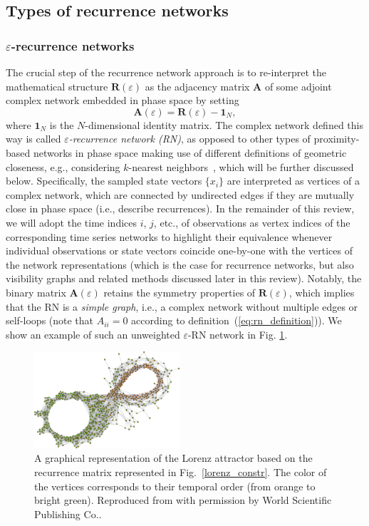 	\subsection{Types of recurrence networks}
		\subsubsection{$\varepsilon$-recurrence networks}
		The crucial step of the recurrence network approach is to re-interpret the mathematical structure $\textbf{R}(\varepsilon)$ as the adjacency matrix $\mathbf{A}$ of some adjoint complex network embedded in phase space by setting
\begin{equation}
\mathbf{A}(\varepsilon)=\mathbf{R}(\varepsilon)-\mathbf{1}_N,
\label{eq:rn_definition}
\end{equation}
\noindent
where $\mathbf{1}_N$ is the $N$-dimensional identity matrix. The complex network defined this way is called \emph{$\varepsilon$-recurrence network (RN)}, as opposed to other types of proximity-based networks in phase space making use of different definitions of geometric closeness, e.g., considering $k$-nearest neighbors~\cite{Donner2011}, which will be further discussed below. Specifically, the sampled state vectors $\{x_i\}$ are interpreted as vertices of a complex network, which are connected by undirected edges if they are mutually close in phase space (i.e., describe recurrences). In the remainder of this review, we will adopt the time indices $i$, $j$, etc., of observations as vertex indices of the corresponding time series networks to highlight their equivalence whenever individual observations or state vectors coincide one-by-one with the vertices of the network representations (which is the case for recurrence networks, but also visibility graphs and related methods discussed later in this review). Notably, the binary matrix $\mathbf{A}(\varepsilon)$ retains the symmetry properties of $\mathbf{R}(\varepsilon)$, which implies that the RN is a \emph{simple graph}, i.e., a complex network without multiple edges or self-loops (note that $A_{ii}=0$ according to definition~(\ref{eq:rn_definition})). We show an example of such an unweighted  $\varepsilon$-RN network in Fig. \ref{lorenz_net}.
\begin{figure}
	\centering
	\includegraphics[width=0.48\textwidth]{Chapter03_RecurrenceNt/lorenz_net.eps}
\caption{A graphical representation of the Lorenz attractor based on the recurrence matrix represented in Fig.~\ref{lorenz_constr}. The color of the vertices corresponds to their temporal order (from orange to bright green). Reproduced from \cite{Donner2011} with permission by World Scientific Publishing Co.. }
\label{lorenz_net}
\end{figure}

